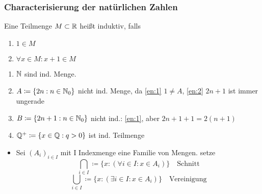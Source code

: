 \documentclass[consecutivenumbering]{gadsescript}
\begin{document}
\subsubsection{Characterisierung der natürlichen Zahlen}
\begin{subdefinition}
	Eine Teilmenge $ M \subset \mathbb{R} $ heißt induktiv, falls
	\begin{enumerate}[label=(\roman*)]
		\item \label{en:1}$ 1 \in M $
		\item \label{en:2}$ \forall x \in M : x + 1 \in M $
	\end{enumerate}
	\begin{subexample}
		\begin{enumerate}[label=(\alph*)]
			\item $ \mathbb{N} $ sind ind. Menge.
			\item $ A \coloneqq \{ 2n : n \in \mathbb{N}_0 \} $ nicht ind. Menge, da \ref{en:1} $ 1 \neq A $, \ref{en:2} $2n + 1 $ ist immer ungerade
			\item $ B \coloneqq \{ 2n + 1 : n \in \mathbb{N}_0 \} $ nicht ind.: \ref{en:1}, aber $ 2n + 1 + 1 = 2 (n+1) $
			\item $\mathbb{Q}^+ \coloneqq \{ x \in \mathbb{Q}: q > 0 \} $ ist ind. Teilmenge
		\end{enumerate}
	\end{subexample}
\end{subdefinition}
\begin{itemize}
	\item Sei $ (A_i)_{i\in I} $ mit I Indexmenge eine Familie von Mengen. setze
		\[ \bigcap_{i\in I} \coloneqq \{ x : (\forall i \in I: x \in A_i ) \}\quad\text{Schnitt} \]
		\[ \bigcup_{i\in I} \coloneqq \{ x : ( \exists i \in I: x \in A_i ) \}\quad\text{Vereinigung} \]
\end{itemize}
\end{document}

